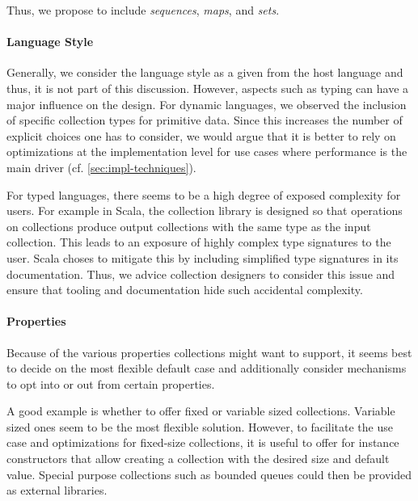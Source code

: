 \documentclass[sigconf, 10pt]{acmart}
\begin{document}
Thus, we propose to include \emph{sequences}, \emph{maps}, and \emph{sets}.

\paragraph{Language Style}

Generally, we consider the language style as a given from the host language
and thus, it is not part of this discussion.
However, aspects such as typing can have a major influence on the design.
For dynamic languages,
we observed the inclusion of specific collection types for primitive data.
Since this increases the number of explicit choices one has to consider,
we would argue that it is better to rely on optimizations
at the implementation level for use cases
where performance is the main driver (cf. \cref{sec:impl-techniques}).

For typed languages, there seems to be a high degree of exposed complexity
for users.
For example in Scala, the collection library is designed
so that operations on collections produce output collections
with the same type as the input collection\citep{Odersky:2009}.
This leads to an exposure of highly complex type signatures to the user.
Scala choses to mitigate this by including simplified type signatures
in its documentation.
Thus, we advice collection designers to consider this issue
and ensure that tooling and documentation hide such accidental complexity.

\paragraph{Properties}

Because of the various properties collections might want to support,
it seems best to decide on the most flexible default case
and additionally consider mechanisms to opt into or out from certain properties.

A good example is whether to offer fixed or variable sized collections.
Variable sized ones seem to be the most flexible solution.
However, to facilitate the use case and optimizations for fixed-size collections,
it is useful to offer for instance constructors
that allow creating a collection with the desired size and default value.
Special purpose collections such as bounded queues could then be provided
as external libraries.
\end{document}
